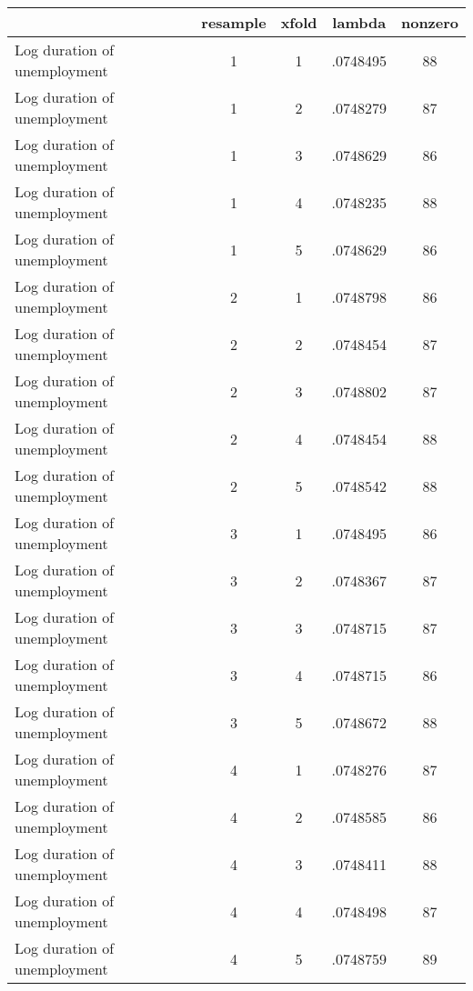 \begin{tabular}{l*{4}{c}}
\hline\hline
                    &    resample&       xfold&      lambda&     nonzero\\
\hline
Log duration of unemployment&           1&           1&    .0748495&          88\\
Log duration of unemployment&           1&           2&    .0748279&          87\\
Log duration of unemployment&           1&           3&    .0748629&          86\\
Log duration of unemployment&           1&           4&    .0748235&          88\\
Log duration of unemployment&           1&           5&    .0748629&          86\\
Log duration of unemployment&           2&           1&    .0748798&          86\\
Log duration of unemployment&           2&           2&    .0748454&          87\\
Log duration of unemployment&           2&           3&    .0748802&          87\\
Log duration of unemployment&           2&           4&    .0748454&          88\\
Log duration of unemployment&           2&           5&    .0748542&          88\\
Log duration of unemployment&           3&           1&    .0748495&          86\\
Log duration of unemployment&           3&           2&    .0748367&          87\\
Log duration of unemployment&           3&           3&    .0748715&          87\\
Log duration of unemployment&           3&           4&    .0748715&          86\\
Log duration of unemployment&           3&           5&    .0748672&          88\\
Log duration of unemployment&           4&           1&    .0748276&          87\\
Log duration of unemployment&           4&           2&    .0748585&          86\\
Log duration of unemployment&           4&           3&    .0748411&          88\\
Log duration of unemployment&           4&           4&    .0748498&          87\\
Log duration of unemployment&           4&           5&    .0748759&          89\\

\end{tabular}
